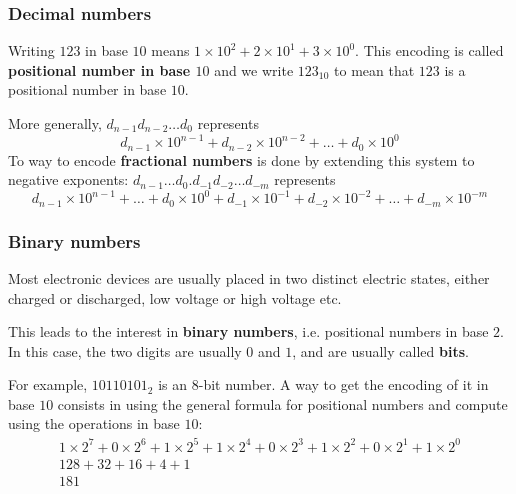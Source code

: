 
%
\begin{frame}
\frametitle{Decimal numbers}

Writing \(123\) in base \(10\) means \(1 \times 10^2 + 2 \times 10^1 +
3 \times 10^0\). This encoding is called \textbf{positional number in
  base \(10\)} and we write \textbf{\(123_{10}\)} to mean that \(123\)
is a positional number in base \(10\).

\bigskip

More generally, \(d_{n-1}d_{n-2}\dots{d_0}\) represents
\[
d_{n-1} \times 10^{n-1} + d_{n-2} \times 10^{n-2} + \dots + d_{0}
\times 10^{0}
\]
To way to encode \textbf{fractional numbers} is done by extending this
system to negative exponents:
\(d_{n-1}\dots{d_0}.d_{-1}d_{-2}\dots{d_{-m}}\) represents
\[
d_{n-1} \times 10^{n-1} + \dots + d_{0} \times
10^{0} + d_{-1} \times 10^{-1} + d_{-2} \times 10^{-2} + \dots +
d_{-m} \times 10^{-m}
\]

\end{frame}

% 
\begin{frame}
\frametitle{Binary numbers}

Most electronic devices are usually placed in two distinct electric
states, either charged or discharged, low voltage or high voltage
etc. 

\bigskip

This leads to the interest in \textbf{binary numbers}, i.e. positional
numbers in base \(2\). In this case, the two digits are usually \(0\)
and \(1\), and are usually called \textbf{bits}.

\bigskip

For example, \(10110101_2\) is an \(8\)-bit number. A way to get the
encoding of it in base \(10\) consists in using the general formula
for positional numbers and compute using the operations in base
\(10\):
\begin{gather*}
1 \times 2^7 + 0 \times 2^6 + 1 \times 2^5 + 1 \times 2^4 + 0 \times
2^3 + 1 \times 2^2 + 0 \times 2^1 + 1 \times 2^0\\
128 + 32 + 16 + 4 + 1\\
181
\end{gather*}

\end{frame}

